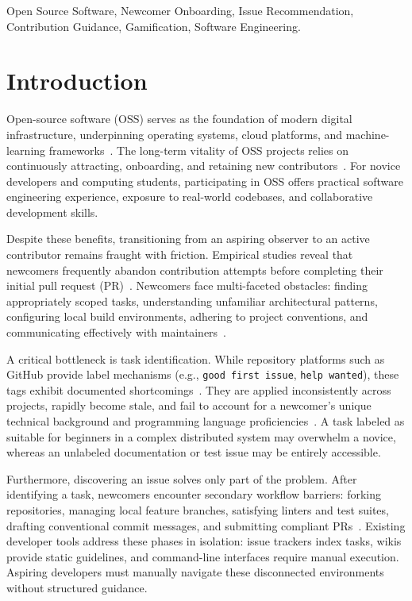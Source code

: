 \documentclass[conference]{IEEEtran}
\begin{document}
\begin{IEEEkeywords}
Open Source Software, Newcomer Onboarding, Issue Recommendation, Contribution Guidance, Gamification, Software Engineering.
\end{IEEEkeywords}

\section{Introduction}
Open-source software (OSS) serves as the foundation of modern digital infrastructure, underpinning operating systems, cloud platforms, and machine-learning frameworks~\cite{mockus2002two}. The long-term vitality of OSS projects relies on continuously attracting, onboarding, and retaining new contributors~\cite{steinmacher2015systematic}. For novice developers and computing students, participating in OSS offers practical software engineering experience, exposure to real-world codebases, and collaborative development skills.

Despite these benefits, transitioning from an aspiring observer to an active contributor remains fraught with friction. Empirical studies reveal that newcomers frequently abandon contribution attempts before completing their initial pull request (PR)~\cite{steinmacher2018almost, dagenais2010moving}. Newcomers face multi-faceted obstacles: finding appropriately scoped tasks, understanding unfamiliar architectural patterns, configuring local build environments, adhering to project conventions, and communicating effectively with maintainers~\cite{steinmacher2015systematic}.

A critical bottleneck is task identification. While repository platforms such as GitHub provide label mechanisms (e.g., \texttt{good first issue}, \texttt{help wanted}), these tags exhibit documented shortcomings~\cite{tan2020first, subramanian2020empirical}. They are applied inconsistently across projects, rapidly become stale, and fail to account for a newcomer's unique technical background and programming language proficiencies~\cite{xiao2022recommending}. A task labeled as suitable for beginners in a complex distributed system may overwhelm a novice, whereas an unlabeled documentation or test issue may be entirely accessible.

Furthermore, discovering an issue solves only part of the problem. After identifying a task, newcomers encounter secondary workflow barriers: forking repositories, managing local feature branches, satisfying linters and test suites, drafting conventional commit messages, and submitting compliant PRs~\cite{storey2017social, steinmacher2016overcoming}. Existing developer tools address these phases in isolation: issue trackers index tasks, wikis provide static guidelines, and command-line interfaces require manual execution. Aspiring developers must manually navigate these disconnected environments without structured guidance.
\end{document}
